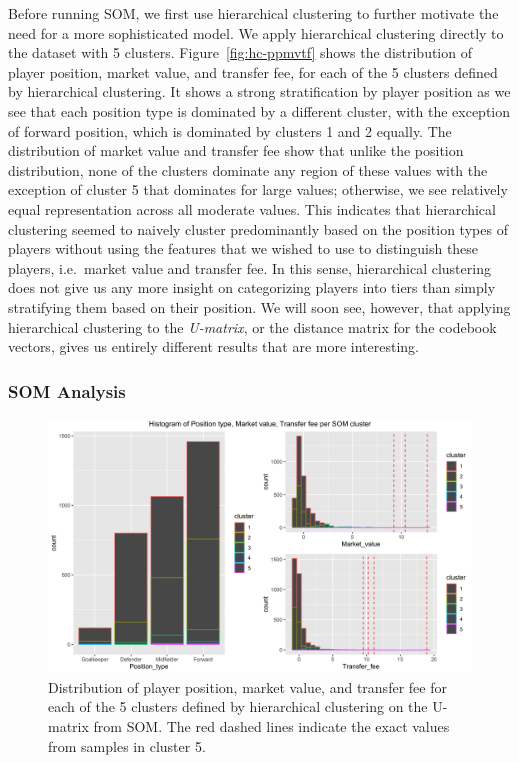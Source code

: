 Before running SOM, we first use hierarchical clustering
to further motivate the need for a more sophisticated model.
We apply hierarchical clustering directly to the dataset with 5 clusters.
Figure~\ref{fig:hc-ppmvtf} shows the distribution of player position,
market value, and transfer fee, for each of the 5 clusters defined by hierarchical clustering.
It shows a strong stratification by player position 
as we see that each position type is dominated by a different cluster,
with the exception of forward position, which is dominated by clusters 1 and 2 equally.
The distribution of market value and transfer fee show that
unlike the position distribution, none of the clusters
dominate any region of these values with the exception of cluster 5 that 
dominates for large values; otherwise, we see relatively equal representation
across all moderate values.
This indicates that hierarchical clustering seemed to naively cluster
predominantly based on the position types of players without using 
the features that we wished to use to distinguish these players,
i.e.\ market value and transfer fee.
In this sense, hierarchical clustering does not give us any more insight
on categorizing players into tiers than simply stratifying them based on their position.
We will soon see, however, that applying hierarchical clustering to the \emph{U-matrix},
or the distance matrix for the codebook vectors,
gives us entirely different results that are more interesting.

\subsubsection{SOM Analysis}

\begin{figure}[t]
    \centering
    \includegraphics[width=\textwidth]{../figs/transfer_som_ppmvtf.png}
    \caption{Distribution of player position, 
             market value, and transfer fee for 
             each of the 5 clusters defined by hierarchical clustering
             on the U-matrix from SOM.
             The red dashed lines indicate the exact values from samples in cluster 5.}
    \label{fig:som-ppmvtf}
\end{figure}

